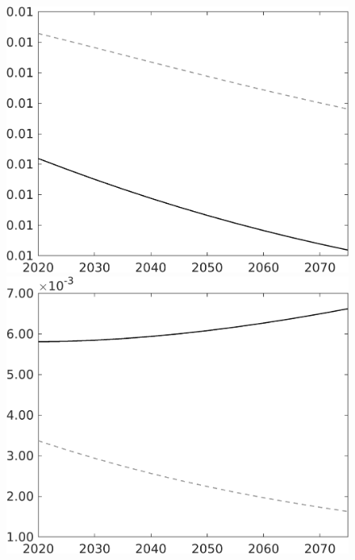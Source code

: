 \documentclass[12pt]{article}
\begin{document}
\begin{figure}
\begin{minipage}[]{0.32\textwidth}
	\end{minipage}
	\begin{minipage}[]{0.32\textwidth}
		\includegraphics[width=1\textwidth]{../../codding_model/own_basedOnFried/optimalPol_010922_revision/figures/all_13Sept22/LevTaufNoTauf_TaulCalib_regime0_wsf_spillover0_nsk0_xgr0_knspil1_sep1_LFlimit0_emsbase0_countec0_GovRev0_etaa0.79_lgd0.png}
	\end{minipage}
	\begin{minipage}[]{0.32\textwidth}
		\includegraphics[width=1\textwidth]{../../codding_model/own_basedOnFried/optimalPol_010922_revision/figures/all_13Sept22/LevTaufNoTauf_TaulCalib_regime0_wsg_spillover0_nsk0_xgr0_knspil1_sep1_LFlimit0_emsbase0_countec0_GovRev0_etaa0.79_lgd0.png}

\end{minipage}
\end{figure}
\end{document}
